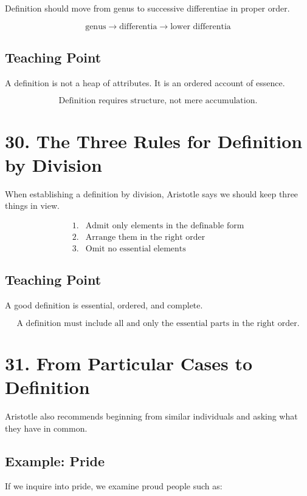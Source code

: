 \documentclass[12pt]{article}
\begin{document}
Definition should move from genus to successive differentiae in proper order.

\[
\text{genus} \rightarrow \text{differentia} \rightarrow \text{lower differentia}
\]

\subsection*{Teaching Point}

A definition is not a heap of attributes. It is an ordered account of essence.

\[
\boxed{
\text{Definition requires structure, not mere accumulation.}
}
\]

\section*{30. The Three Rules for Definition by Division}

When establishing a definition by division, Aristotle says we should keep three
things in view.

\[
\begin{array}{ll}
1. & \text{Admit only elements in the definable form} \\
2. & \text{Arrange them in the right order} \\
3. & \text{Omit no essential elements}
\end{array}
\]

\subsection*{Teaching Point}

A good definition is essential, ordered, and complete.

\[
\boxed{
\text{A definition must include all and only the essential parts in the right order.}
}
\]

\section*{31. From Particular Cases to Definition}

Aristotle also recommends beginning from similar individuals and asking what
they have in common.

\subsection*{Example: Pride}

If we inquire into pride, we examine proud people such as:
\end{document}
